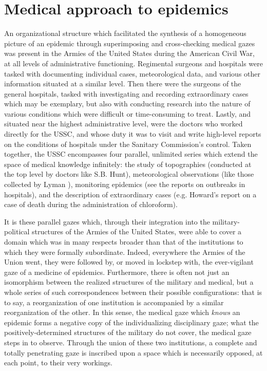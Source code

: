 \documentclass{report}
\begin{document}
  \section{Medical approach to epidemics}\label{sec:medical-epidemic}
  An organizational structure which facilitated the synthesis of a homogeneous picture of an epidemic through superimposing and cross-checking 
  medical gazes was present in the Armies of the United States during the American Civil War, at all levels of administrative functioning. Regimental
  surgeons and hospitals were tasked with documenting individual cases, meteorological data, and various other information situated at a similar
  level. Then there were the surgeons of the general hospitals, tasked with investigating and recording extraordinary cases which may be exemplary,
  but also with conducting research into the nature of various conditions which were difficult or time-consuming to treat. Lastly, and situated near
  the highest administrative level, were the doctors who worked directly for the USSC, and whose duty it was to visit and write high-level
  reports on the conditions of hospitals under the Sanitary Commission's control. Taken together, the USSC encompasses four parallel,
  unlimited series which extend the space of medical knowledge infinitely\autocite[pp.25]{Foucault1994}: the study of topographies 
  (conducted at the top level by doctors like S.B. Hunt\autocite{ussc:6:882}), meteorological observations (like those collected by Lyman 
  \autocite{ussc:6:775}), monitoring epidemics (see the reports on outbreaks in hospitals\autocite{ussc:9:1367}), and the description of extraordinary 
  cases (e.g. Howard's report on a case of death during the administration of chloroform\autocite{ussc:9:1340}).

  It is these parallel gazes which, through their integration into the military-political structures of the Armies of the United States, were able to cover
  a domain which was in many respects broader than that of the institutions to which they were formally subordinate. Indeed, everywhere the Armies
  of the Union went, they were followed by, or moved in lockstep with, the ever-vigilant gaze of a medicine of epidemics. Furthermore,
  there is often not just an isomorphism between the realized structures of the military and medical, but a whole series of such correspondences
  between their possible configurations: that is to say, a reorganization of one institution is accompanied by a similar reorganization of the
  other. In this sense, the medical gaze which \textit{knows} an epidemic forms a negative copy of the individualizing disciplinary gaze; what the
  positively-determined structures of the military do not cover, the medical gaze steps in to observe. Through the union of these two institutions,
  a complete and totally penetrating gaze is inscribed upon a space which is necessarily opposed, at each point, to their very workings.
\end{document}
